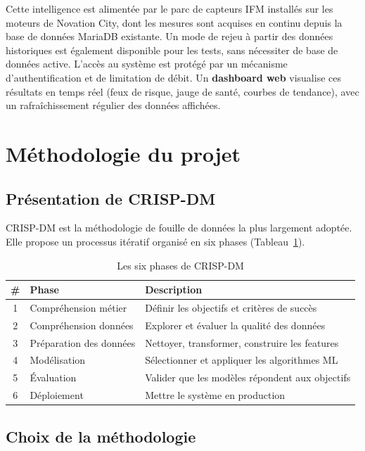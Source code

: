\documentclass[12pt,a4paper]{report}
\begin{document}
Cette intelligence est alimentée par le parc de capteurs IFM installés sur les
moteurs de Novation City, dont les mesures sont acquises en continu depuis la base
de données MariaDB existante. Un mode de rejeu à partir des données historiques est
également disponible pour les tests, sans nécessiter de base de données active.
L'accès au système est protégé par un mécanisme d'authentification et de limitation
de débit. Un \textbf{dashboard web} visualise ces résultats en temps réel (feux de
risque, jauge de santé, courbes de tendance), avec un rafraîchissement régulier des
données affichées.

\section{Méthodologie du projet}

\subsection{Présentation de CRISP-DM}

CRISP-DM \cite{chapman2000} est la méthodologie de fouille de données la plus largement
adoptée. Elle propose un processus itératif organisé en six phases (Tableau~\ref{tab:crispdm}).

\begin{table}[H]
\centering
\caption{Les six phases de CRISP-DM}
\label{tab:crispdm}
\begin{tabular}{clp{8cm}}
\toprule
\textbf{\#} & \textbf{Phase} & \textbf{Description} \\
\midrule
1 & Compréhension métier   & Définir les objectifs et critères de succès \\
2 & Compréhension données  & Explorer et évaluer la qualité des données \\
3 & Préparation des données & Nettoyer, transformer, construire les features \\
4 & Modélisation           & Sélectionner et appliquer les algorithmes ML \\
5 & Évaluation             & Valider que les modèles répondent aux objectifs \\
6 & Déploiement            & Mettre le système en production \\
\bottomrule
\end{tabular}
\end{table}

\subsection{Choix de la méthodologie}
\end{document}
